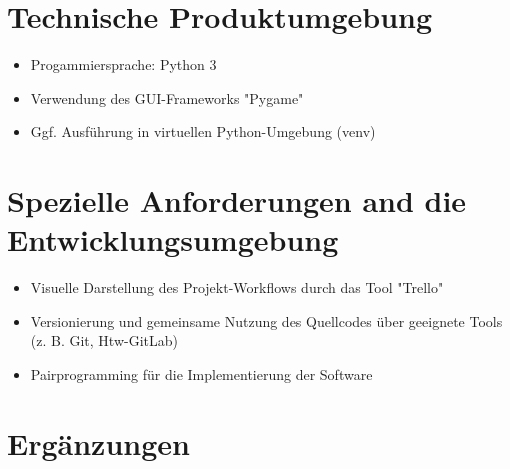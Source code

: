 \documentclass[paper=a4,fontsize=11pt,DIV14]{scrartcl}%
\numberwithin{equation}{section}
\begin{document}
\section{Technische Produktumgebung}
\begin{itemize}
    \item Progammiersprache: Python 3
    \item Verwendung des GUI-Frameworks "Pygame"
    \item Ggf. Ausführung in virtuellen Python-Umgebung (venv)
\end{itemize}
\section{Spezielle Anforderungen and die Entwicklungsumgebung}
\begin{itemize}
    \item Visuelle Darstellung des Projekt-Workflows durch das Tool "Trello"
    \item Versionierung und gemeinsame Nutzung des Quellcodes über geeignete Tools (z. B. Git, Htw-GitLab)
    \item Pairprogramming für die Implementierung der Software
\end{itemize}
\section{Ergänzungen}
\end{document}
